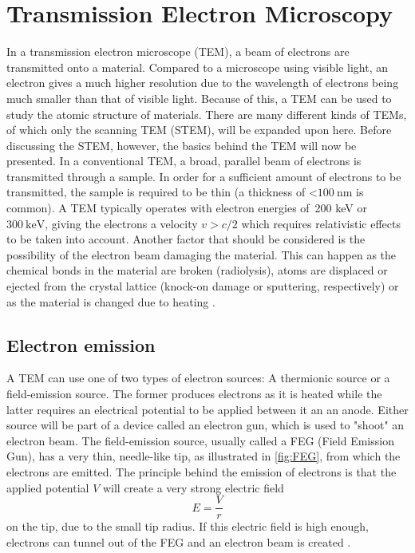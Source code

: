 \section{Transmission Electron Microscopy}
In a transmission electron microscope (TEM), a beam of electrons are transmitted onto a material. Compared to a microscope using visible light, an electron gives a much higher resolution due to the wavelength of electrons being much smaller than that of visible light. Because of this, a TEM can be used to study the atomic structure of materials.
There are many different kinds of TEMs, of which only the scanning TEM (STEM), will be expanded upon here. Before discussing the STEM, however, the basics behind the TEM will now be presented. In a conventional TEM, a broad, parallel beam of electrons is transmitted through a sample. In order for a sufficient amount of electrons to be transmitted, the sample is required to be thin (a thickness of <$\SI{100}{\nano\meter}$ is common). A TEM typically operates with electron energies of 200 keV or $\SI{300}{\kilo\electronvolt}$, giving the electrons a velocity $v > c/2$ which requires relativistic effects to be taken into account. Another factor that should be considered is the possibility of the electron beam damaging the material. This can happen as the chemical bonds in the material are broken (radiolysis), atoms are displaced or ejected from the crystal lattice (knock-on damage or sputtering, respectively) or as the material is changed due to heating \cite{williams-carter}.

	\subsection{Electron emission}
A TEM can use one of two types of electron sources: A thermionic source or a field-emission source. The former produces electrons as it is heated while the latter requires an electrical potential to be applied between it an an anode. Either source will be part of a device called an electron gun, which is used to "shoot" an electron beam. The field-emission source, usually called a FEG (Field Emission Gun), has a very thin, needle-like tip, as illustrated in \cref{fig:FEG}, from which the electrons are emitted. The principle behind the emission of electrons is that the applied potential $V$ will create a very strong electric field
\begin{equation*}
E=\frac{V}{r}
\end{equation*}
on the tip, due to the small tip radius. If this electric field is high enough, electrons can tunnel out of the FEG and an electron beam is created \cite{williams-carter}.

